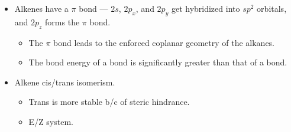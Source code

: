 \documentclass[../notes.tex]{subfiles}
\begin{document}
\begin{itemize}
\begin{itemize}
    \end{itemize}
    \item Alkenes have a $\pi$ bond --- $2s$, $2p_x$, and $2p_y$ get hybridized into $sp^2$ orbitals, and $2p_z$ forms the $\pi$ bond.
    \begin{itemize}
        \item The $\pi$ bond leads to the enforced coplanar geometry of the alkanes.
        \item The bond energy of a  bond is significantly greater than that of a  bond.
    \end{itemize}
    \item Alkene cis/trans isomerism.
    \begin{itemize}
        \item Trans is more stable b/c of steric hindrance.
        \item E/Z system.
    \end{itemize}
\end{itemize}
\end{document}
